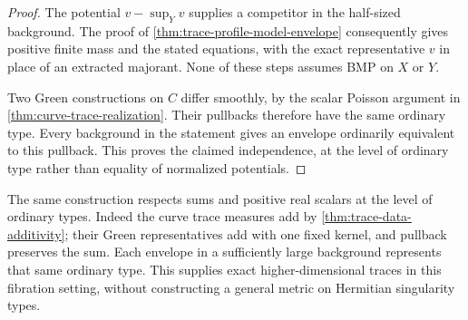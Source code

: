 \begin{proof}
The potential $v-\sup_Yv$ supplies a competitor in the half-sized background. The proof of \cref{thm:trace-profile-model-envelope} consequently gives positive finite mass and the stated equations, with the exact representative $v$ in place of an extracted majorant. None of these steps assumes BMP on $X$ or $Y$.

Two Green constructions on $C$ differ smoothly, by the scalar Poisson argument in \cref{thm:curve-trace-realization}. Their pullbacks therefore have the same ordinary type. Every background in the statement gives an envelope ordinarily equivalent to this pullback. This proves the claimed independence, at the level of ordinary type rather than equality of normalized potentials.
\end{proof}

The same construction respects sums and positive real scalars at the level of ordinary types. Indeed the curve trace measures add by \cref{thm:trace-data-additivity}; their Green representatives add with one fixed kernel, and pullback preserves the sum. Each envelope in a sufficiently large background represents that same ordinary type. This supplies exact higher-dimensional traces in this fibration setting, without constructing a general metric on Hermitian singularity types.
